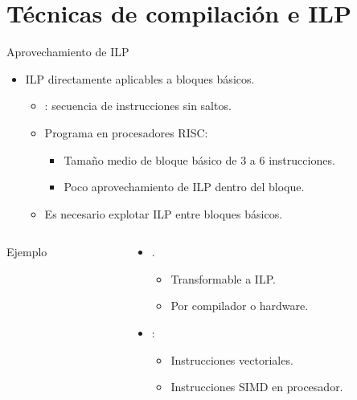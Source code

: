 \section{Técnicas de compilación e ILP}

\begin{frame}[t]{Aprovechamiento de ILP}
\begin{itemize}
  \item ILP directamente aplicables a bloques básicos.
    \begin{itemize}
      \item {}: secuencia de instrucciones sin saltos.
      \item Programa  en procesadores RISC:
        \begin{itemize}
          \item Tamaño medio de bloque básico de 3 a 6 instrucciones.
          \item Poco aprovechamiento de ILP dentro del bloque.
        \end{itemize}
      \item Es necesario explotar ILP entre bloques básicos.
    \end{itemize}
\end{itemize}

\begin{columns}

  \begin{column}{.4\textwidth}
    \begin{block}{Ejemplo}
      
    \end{block}
  \end{column}

  \begin{column}{.6\textwidth}
    \begin{itemize}
      \item {}.
        \begin{itemize}
          \item Transformable a ILP.
          \item Por compilador o hardware.
        \end{itemize}
      \item {}:
        \begin{itemize}
          \item Instrucciones vectoriales.
          \item Instrucciones SIMD en procesador.
        \end{itemize}
    \end{itemize}
  \end{column}
\end{columns}
\end{frame}

